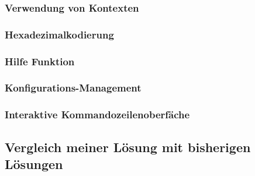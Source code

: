  \subsubsection{Verwendung von Kontexten}
 \subsubsection{Hexadezimalkodierung}\label{Hexadecimalencoding}
 \subsubsection{Hilfe Funktion}
 \subsubsection{Konfigurations-Management}\label{ConfigurationManagement}
 \subsubsection{Interaktive Kommandozeilenoberfäche}
 \subsection{Vergleich meiner Lösung mit bisherigen Lösungen}\label{subsec:Comparison}